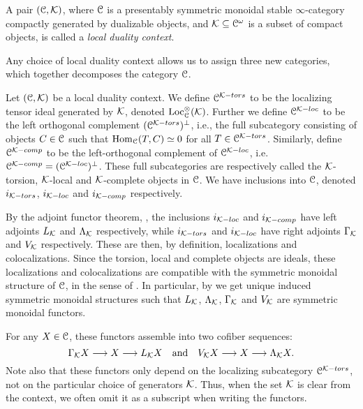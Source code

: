 \begin{definition}
    \label{ch0:def:local-duality-context}
    A pair $(\EuScript{C}, \mathcal{K})$, where $\EuScript{C}$ is a presentably symmetric monoidal stable $\infty$-category compactly generated by dualizable objects, and $\mathcal{K}\subseteq \EuScript{C}^\omega$ is a subset of compact objects, is called a \emph{local duality context}.
\end{definition}

Any choice of local duality context allows us to assign three new categories, which together decomposes the category $\EuScript{C}$. 

\begin{construction}
    \label{ch0:const:local-duality-categories}
    Let $(\EuScript{C}, \mathcal{K})$ be a local duality context. We define $\EuScript{C}^{\mathcal{K}-tors}$ to be the localizing tensor ideal generated by $\mathcal{K}$, denoted $\operatorname{Loc}^\otimes_{\EuScript{C}}(\mathcal{K})$. Further we define $\EuScript{C}^{\mathcal{K}-loc}$ to be the left orthogonal complement $(\EuScript{C}^{\mathcal{K}-tors})^\perp$, i.e., the full subcategory consisting of objects $C\in \EuScript{C}$ such that $\operatorname{Hom}_{\EuScript{C}}(T,C)\simeq 0$ for all $T\in \EuScript{C}^{\mathcal{K}-tors}$. Similarly, define $\EuScript{C}^{\mathcal{K}-comp}$ to be the left-orthogonal complement of $\EuScript{C}^{\mathcal{K}-loc}$, i.e. $\EuScript{C}^{\mathcal{K}-comp}= (\EuScript{C}^{\mathcal{K}-loc})^\perp$. These full subcategories are respectively called the $\mathcal{K}$-torsion, $\mathcal{K}$-local and $\mathcal{K}$-complete objects in $\EuScript{C}$. We have inclusions into $\EuScript{C}$, denoted $i_{\mathcal{K}-tors}$, $i_{\mathcal{K}-loc}$ and $i_{\mathcal{K}-comp}$ respectively. 
    
    By the adjoint functor theorem, \cite[5.5.2.9]{lurie_09}, the inclusions $i_{\mathcal{K}-loc}$ and $i_{\mathcal{K}-comp}$ have left adjoints $L_{\mathcal{K}}$ and $\Lambda_{\mathcal{K}}$ respectively, while $i_{\mathcal{K}-tors}$ and $i_{\mathcal{K}-loc}$ have right adjoints $\Gamma_{\mathcal{K}}$ and $V_{\mathcal{K}}$ respectively. These are then, by definition, localizations and colocalizations. Since the torsion, local and complete objects are ideals, these localizations and colocalizations are compatible with the symmetric monoidal structure of $\EuScript{C}$, in the sense of \cite[2.2.1.7]{Lurie_HA}. In particular, by \cite[2.2.1.9]{Lurie_HA} we get unique induced symmetric monoidal structures such that $L_{\mathcal{K}}$, $\Lambda_{\mathcal{K}}$, $\Gamma_{\mathcal{K}}$ and $V_{\mathcal{K}}$ are symmetric monoidal functors. 

    For any $X\in \EuScript{C}$, these functors assemble into two cofiber sequences:
    $$\Gamma_{\mathcal{K}} X \longrightarrow X \longrightarrow L_{\mathcal{K}} X \quad \text{and}\quad V_{\mathcal{K}} X \longrightarrow X \longrightarrow \Lambda_{\mathcal{K}} X.$$
    Note also that these functors only depend on the localizing subcategory $\EuScript{C}^{\mathcal{K}-tors}$, not on the particular choice of generators $\mathcal{K}$. Thus, when the set $\mathcal{K}$ is clear from the context, we often omit it as a subscript when writing the functors. 
\end{construction}

